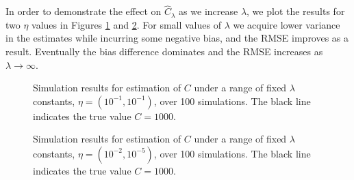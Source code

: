 \documentclass[oupdraft]{bio}
\begin{document}
In order to demonstrate the effect on $\widehat{C}_{\lambda}$ as we increase $\lambda$, we plot the results for two $\eta$ values in Figures \ref{fig:fixed_lambda} and \ref{fig:fixed_lambda_2}.  For small values of $\lambda$ we acquire lower variance in the estimates while incurring some negative bias, and the RMSE improves as a result.  Eventually the bias difference dominates and the RMSE increases as $\lambda \to \infty$.


\begin{figure}[p]
\caption{Simulation results for estimation of $C$ under a range of fixed $\lambda$ constants, $\eta = (10^{-1}, 10^{-1})$, over 100 simulations. The black line indicates the true value $C = 1000$.
\label{fig:fixed_lambda}}
\centering{}
\end{figure}


\begin{figure}[p]
\caption{Simulation results for estimation of $C$ under a range of fixed $\lambda$ constants, $\eta = (10^{-2}, 10^{-5})$, over 100 simulations.  The black line indicates the true value $C = 1000$.
\label{fig:fixed_lambda_2}}
\centering{}
\end{figure}
\end{document}
